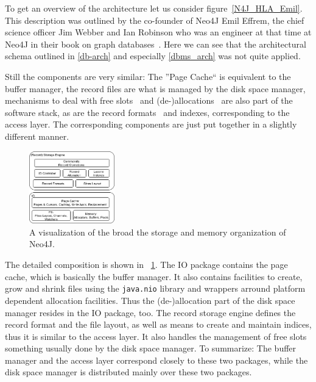         To get an overview of the architecture let us consider figure~\ref{N4J_HLA_Emil}.
        This description was outlined by the co-founder of Neo4J Emil Effrem, the chief science officer Jim Webber and Ian Robinson who was an engineer at that time at Neo4J in their book on graph databases~\autocite{robinson2015graph}.
        Here we can see that the architectural schema outlined in \ref{db-arch} and especially \ref{dbms_arch} was not quite applied.
        
        Still the components are very similar:
        The ''Page Cache`` is equivalent to the buffer manager, the record files are what is managed by the disk space manager, mechanisms to deal with free slots~\autocite{neo4jidgenerator} and (de-)allocations~\autocite{neo4jio} are also part of the software stack, as are the record formats~\autocite{neo4jrecordstorage} and indexes, corresponding to the access layer. 
        The corresponding components are just put together in a slightly different manner. 
        
        \begin{figure}[htp]
            \begin{center}
                \includegraphics[keepaspectratio,width=0.33\textwidth,height=0.3\textheight]{img/04-databases/N4J_Storage.png}
            \end{center}
            \caption{A visualization of the broad the storage and memory organization of Neo4J.} \label{N4J_Storage}
        \end{figure}
        
        The detailed composition is shown in ~\ref{N4J_Storage}.
        The IO package contains the page cache, which is basically the buffer manager.
        It also contains facilities to create, grow and shrink files using the \texttt{java.nio} library and wrappers arround platform dependent allocation facilities.
        Thus the (de-)allocation part of the disk space manager resides in the IO package, too.
        The record storage engine defines the record format and the file layout, as well as means to create and maintain indices, thus it is similar to the access layer. 
        It also handles the management of free slots something usually done by the disk space manager.
        To summarize: The buffer manager and the access layer correspond closely to these two packages, while the disk space manager is distributed mainly over these two packages.        

